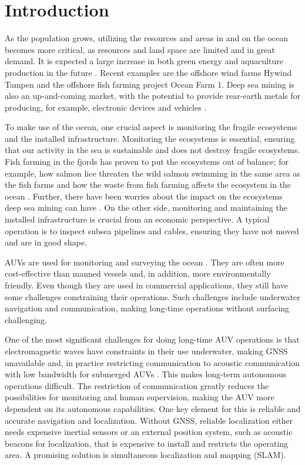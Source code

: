 \chapter{Introduction}

As the population grows, utilizing the resources and areas in and on the ocean becomes more critical, as resources and land space are limited and in great demand. It is expected a large increase in both green energy and aquaculture production in the future \cite{Oceans2050}. Recent examples are the offshore wind farms Hywind Tampen \cite{HywindEquinor} and the offshore fish farming project Ocean Farm 1\cite{HavbasertASA}. Deep sea mining is also an up-and-coming market, with the potential to provide rear-earth metals for producing, for example, electronic devices and vehicles \cite{Bogue2015UnderwaterApplications}.

To make use of the ocean, one crucial aspect is monitoring the fragile ecosystems and the installed infrastructure. Monitoring the ecosystems is essential, ensuring that our activity in the sea is sustainable and does not destroy fragile ecosystems. Fish farming in the fjords has proven to put the ecosystems out of balance; for example, how salmon lice threaten the wild salmon swimming in the same area as the fish farms and how the waste from fish farming affects the ecosystem in the ocean \cite{Fiskeoppdrett}. Further, there have been worries about the impact on the ecosystems deep sea mining can have \cite{UnderstandingTechnology}. On the other side, monitoring and maintaining the installed infrastructure is crucial from an economic perspective. A typical operation is to inspect subsea pipelines and cables, ensuring they have not moved and are in good shape. 

AUVs are used for monitoring and surveying the ocean \cite{Nicholson2008TheTechnologies, HaugstadDenManeder}. They are often more cost-effective than manned vessels and, in addition, more environmentally friendly. Even though they are used in commercial applications, they still have some challenges constraining their operations. Such challenges include underwater navigation and communication, making long-time operations without surfacing challenging. 

One of the most significant challenges for doing long-time AUV operations is that electromagnetic waves have constraints in their use underwater, making GNSS unavailable and, in practice restricting communication to acoustic communication with low bandwidth for submerged AUVs \cite{Nicholson2008TheTechnologies}. This makes long-term autonomous operations difficult. The restriction of communication greatly reduces the possibilities for monitoring and human supervision, making the AUV more dependent on its autonomous capabilities. One key element for this is reliable and accurate navigation and localization. Without GNSS, reliable localization either needs expensive inertial sensors or an external position system, such as acoustic beacons for localization, that is expensive to install and restricts the operating area. A promising solution is simultaneous localization and mapping (SLAM).

